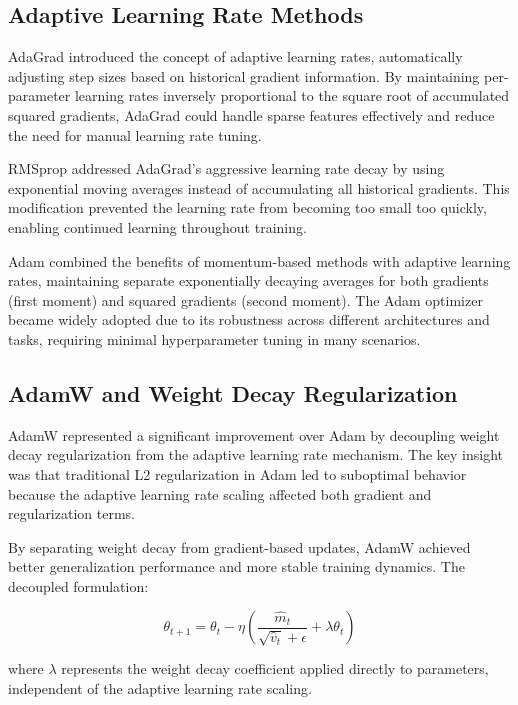 \subsection{Adaptive Learning Rate Methods}

AdaGrad \cite{duchi2011adaptive} introduced the concept of adaptive learning rates, automatically adjusting step sizes based on historical gradient information. By maintaining per-parameter learning rates inversely proportional to the square root of accumulated squared gradients, AdaGrad could handle sparse features effectively and reduce the need for manual learning rate tuning.

RMSprop \cite{tieleman2012lecture} addressed AdaGrad's aggressive learning rate decay by using exponential moving averages instead of accumulating all historical gradients. This modification prevented the learning rate from becoming too small too quickly, enabling continued learning throughout training.

Adam \cite{kingma2017adam} combined the benefits of momentum-based methods with adaptive learning rates, maintaining separate exponentially decaying averages for both gradients (first moment) and squared gradients (second moment). The Adam optimizer became widely adopted due to its robustness across different architectures and tasks, requiring minimal hyperparameter tuning in many scenarios.

\subsection{AdamW and Weight Decay Regularization}

AdamW \cite{loshchilov2019decoupled} represented a significant improvement over Adam by decoupling weight decay regularization from the adaptive learning rate mechanism. The key insight was that traditional L2 regularization in Adam led to suboptimal behavior because the adaptive learning rate scaling affected both gradient and regularization terms.

By separating weight decay from gradient-based updates, AdamW achieved better generalization performance and more stable training dynamics. The decoupled formulation:

\begin{equation}
\theta_{t+1} = \theta_t - \eta \left( \frac{\hat{m}_t}{\sqrt{\hat{v}_t} + \epsilon} + \lambda \theta_t \right)
\end{equation}

where $\lambda$ represents the weight decay coefficient applied directly to parameters, independent of the adaptive learning rate scaling.

